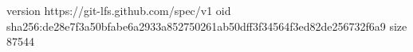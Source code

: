 version https://git-lfs.github.com/spec/v1
oid sha256:de28e7f3a50bfabe6a2933a852750261ab50dff3f34564f3ed82de256732f6a9
size 87544
